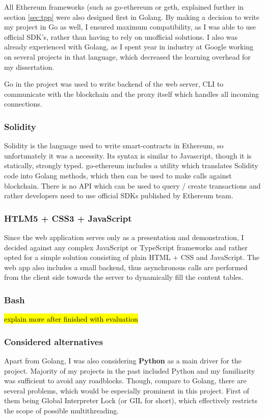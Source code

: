 All Ethereum frameworks (such as go-ethereum or geth, explained further in section \ref{sec:tpp} were also designed first in Golang. By making a decision to write my project in Go as well, I ensured maximum compatibility, as I was able to use official SDK's, rather than having to rely on unofficial solutions. I also was already experienced with Golang, as I spent year in industry at Google working on several projects in that language, which decreased the learning overhead for my dissertation.

Go in the project was used to write backend of the web server, CLI to communicate with the blockchain and the proxy itself which handles all incoming connections.
\subsubsection{Solidity}
Solidity \cite{dannen2017introducing} is the language used to write smart-contracts in Ethereum, so unfortunately it was a necessity. Its syntax is similar to Javascript, though it is statically, strongly typed. go-ethereum includes a utility which translates Solidity code into Golang methods, which then can be used to make calls against blockchain. There is no API which can be used to query / create transactions and rather developers need to use official SDKs published by Ethereum team.
\subsubsection{HTLM5 + CSS3 + JavaScript}
Since the web application serves only as a presentation and demonstration, I decided against any complex JavaScript or TypeScript frameworks and rather opted for a simple solution consisting of plain HTML + CSS and JavaScript. The web app also includes a small backend, thus asynchronous calls are performed from the client side towards the server to dynamically fill the content tables.
\subsubsection{Bash}
\hl{explain more after finished with evaluation}
\subsubsection{Considered alternatives}
Apart from Golang, I was also considering \textbf{Python} as a main driver for the project. Majority of my projects in the past included Python and my familiarity was sufficient to avoid any roadblocks. Though, compare to Golang, there are several problems, which would be especially prominent in this project. First of them being Global Interpreter Lock\cite{beazley2010understanding} (or GIL for short), which effectively restricts the scope of possible multithreading.

